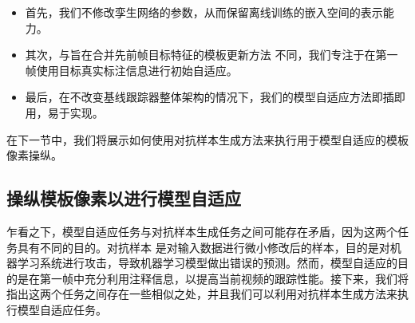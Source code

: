 \begin{itemize}
\item 首先，我们不修改孪生网络的参数，从而保留离线训练的嵌入空间的表示能力。
\item 其次，与旨在合并先前帧目标特征的模板更新方法 \cite{zhu2018distractor, Zhang_2019_ICCV} 不同，我们专注于在第一帧使用目标真实标注信息进行初始自适应。
\item 最后，在不改变基线跟踪器整体架构的情况下，我们的模型自适应方法即插即用，易于实现。
\end{itemize}

在下一节中，我们将展示如何使用对抗样本生成方法来执行用于模型自适应的模板像素操纵。

\subsection{操纵模板像素以进行模型自适应}
乍看之下，模型自适应任务与对抗样本生成任务之间可能存在矛盾，因为这两个任务具有不同的目的。对抗样本 \cite{kurakin2017adversarial} 是对输入数据进行微小修改后的样本，目的是对机器学习系统进行攻击，导致机器学习模型做出错误的预测。然而，模型自适应的目的是在第一帧中充分利用注释信息，以提高当前视频的跟踪性能。接下来，我们将指出这两个任务之间存在一些相似之处，并且我们可以利用对抗样本生成方法来执行模型自适应任务。

